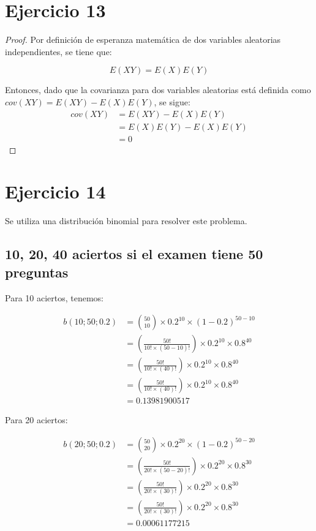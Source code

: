 \documentclass[letterpaper,12pt]{memoir}
\theoremstyle{definition}
\begin{document}
\section*{Ejercicio 13}

\begin{proof}
  Por definición de esperanza matemática de dos variables aleatorias independientes, se tiene que:

  \begin{equation*}
    E(XY) = E(X)E(Y)
  \end{equation*}

  Entonces, dado que la covarianza para dos variables aleatorias está definida como \(cov(XY) = E(XY) - E(X)E(Y)\), se sigue:
  \begin{align*}
    cov(XY) & = E(XY) - E(X)E(Y)\\
            & = E(X)E(Y) - E(X)E(Y)\\
            & = 0
  \end{align*}

\end{proof}

\section*{Ejercicio 14}

Se utiliza una distribución binomial para resolver este problema.

\subsection*{10, 20, 40 aciertos si el examen tiene 50 preguntas}

Para 10 aciertos, tenemos:

\begin{equation*}
  \begin{split}
  b(10;50;0.2)&={50\choose 10} \times 0.2^{10} \times (1 - 0.2)^{50-10}\\
  &=(\frac{50!}{10!\times(50-10)!}) \times 0.2^{10} \times 0.8^{40}\\
  &=(\frac{50!}{10!\times(40)!}) \times 0.2^{10} \times 0.8^{40}\\
  &=(\frac{50!}{10!\times(40)!}) \times 0.2^{10} \times 0.8^{40}\\
  &= 0.13981900517
  \end{split} 
\end{equation*}

Para 20 aciertos:

\begin{equation*}
\begin{split}
b(20;50;0.2)&={50\choose 20} \times 0.2^{20} \times (1 - 0.2)^{50-20}\\
&=(\frac{50!}{20!\times(50-20)!}) \times 0.2^{20} \times 0.8^{30}\\
&=(\frac{50!}{20!\times(30)!}) \times 0.2^{20} \times 0.8^{30}\\
&=(\frac{50!}{20!\times(30)!}) \times 0.2^{20} \times 0.8^{30}\\
&= 0.00061177215
\end{split} 
\end{equation*}
\end{document}
